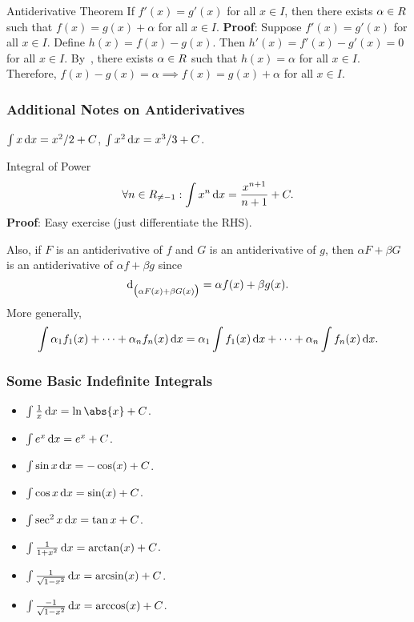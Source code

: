 \begin{Theorem}{Antiderivative Theorem}{}
    If $ f'(x)=g'(x) $ for all $ x\in I $, then there exists $ \alpha\in\relax{R} $
    such that $ f(x)=g(x)+\alpha $ for all $ x\in I $.
    \tcblower{}
    \textbf{Proof}: Suppose $ f'(x)=g'(x) $ for all $ x\in I $. Define $ h(x)=f(x)-g(x) $.
    Then $ h'(x)=f'(x)-g'(x)=0 $
    for all $ x\in I $.
    By~,
    there exists $ \alpha\in\relax{R} $ such that $ h(x)=\alpha $ for all $ x\in I $.
    Therefore, $ f(x)-g(x)=\alpha\implies f(x)=g(x)+\alpha $ for all $ x\in I $.
\end{Theorem}
\subsubsection*{Additional Notes on Antiderivatives}
\begin{Example}{}{}
    $ \int x\odif{x}=x^2/2+C $, $ \int x^2\odif{x}=x^3/3+C $.
\end{Example}
\begin{Theorem}{Integral of Power}{}
    \[ \forall n\in\R_{\ne -1}: \int x^n\odif{x}=\frac{x^{n+1}}{n+1}+C. \]
    \tcblower{}
    \textbf{Proof}: Easy exercise (just differentiate the RHS).
\end{Theorem}
Also, if $ F $ is an antiderivative of $ f $ and $ G $
is an antiderivative of $ g $, then $ \alpha F+\beta G $
is an antiderivative of $ \alpha f+\beta g $
since
\[ \odif*{\bigl(\alpha F(x)+\beta G(x)\bigr)}=\alpha f(x)+\beta g(x). \]
More generally,
\[ \int \alpha_1f_1(x)+\cdots+\alpha_n f_n(x)\odif{x}=\alpha_1 \int f_1(x)\odif{x}+\cdots+\alpha_n \int f_n(x)\odif{x}. \]
\subsubsection*{Some Basic Indefinite Integrals}
\begin{itemize}
    \item $ \int \frac{1}{x}\odif{x}=\ln\abs{x}+C $.
    \item $ \int e^x\odif{x}=e^x+C $.
    \item $ \int \sin x\odif{x}=-\cos (x)+C $.
    \item $ \int \cos x\odif{x}=\sin(x)+C $.
    \item $ \int \sec^2 x\odif{x}=\tan x+C $.
    \item $ \int \frac{1}{1+x^2}\odif{x}=\arctan(x)+C $.
    \item $ \int \frac{1}{\sqrt{1-x^2}}\odif{x}=\arcsin(x)+C $.
    \item $ \int \frac{-1}{\sqrt{1-x^2}}\odif{x}=\arccos(x)+C $.
\end{itemize}